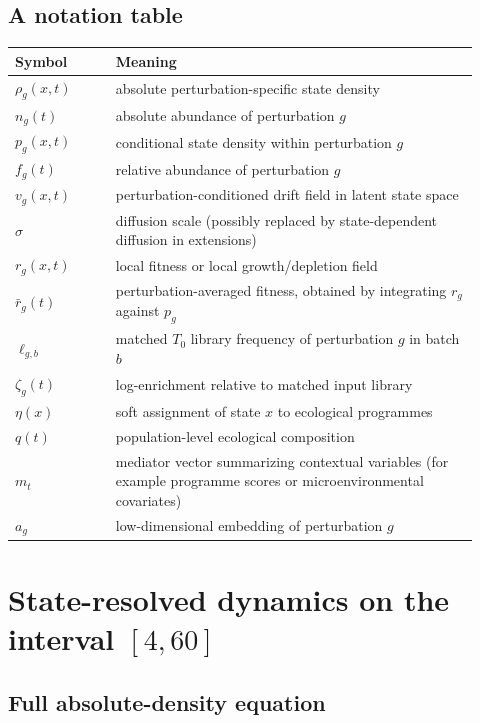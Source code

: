 \documentclass[11pt]{article}
\newcommand{\1}{\mathbf{1}}
\newcommand{\Tzero}{T_0}
\theoremstyle{plain}
\begin{document}
\subsection{A notation table}

\begin{center}
\begin{tabular}{>{\raggedright\arraybackslash}p{0.20\linewidth} >{\raggedright\arraybackslash}p{0.72\linewidth}}
\toprule
Symbol & Meaning \\
\midrule
$\rho_g(x,t)$ & absolute perturbation-specific state density \\
$n_g(t)$ & absolute abundance of perturbation $g$ \\
$p_g(x,t)$ & conditional state density within perturbation $g$ \\
$f_g(t)$ & relative abundance of perturbation $g$ \\
$v_g(x,t)$ & perturbation-conditioned drift field in latent state space \\
$\sigma$ & diffusion scale (possibly replaced by state-dependent diffusion in extensions) \\
$r_g(x,t)$ & local fitness or local growth/depletion field \\
$\bar r_g(t)$ & perturbation-averaged fitness, obtained by integrating $r_g$ against $p_g$ \\
$\ell_{g,b}$ & matched $\Tzero$ library frequency of perturbation $g$ in batch $b$ \\
$\zeta_g(t)$ & log-enrichment relative to matched input library \\
$\eta(x)$ & soft assignment of state $x$ to ecological programmes \\
$q(t)$ & population-level ecological composition \\
$m_t$ & mediator vector summarizing contextual variables (for example programme scores or microenvironmental covariates) \\
$a_g$ & low-dimensional embedding of perturbation $g$ \\
\bottomrule
\end{tabular}
\end{center}

\section{State-resolved dynamics on the interval $[4,60]$}

\subsection{Full absolute-density equation}
\end{document}
